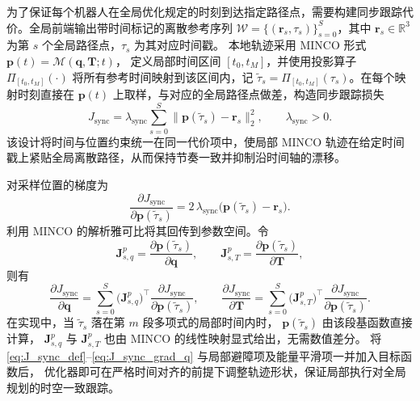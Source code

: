 为了保证每个机器人在全局优化规定的时刻到达指定路径点，需要构建同步跟踪代价。全局前端输出带时间标记的离散参考序列
\(\mathcal{W}=\{(\mathbf{r}_s,\tau_s)\}_{s=0}^{S}\)，其中
\(\mathbf{r}_s\in\mathbb{R}^3\) 为第 \(s\) 个全局路径点，\(\tau_s\) 为其对应时间戳。
本地轨迹采用 MINCO 形式 \(\mathbf{p}(t)=\mathcal{M}(\mathbf{q},\mathbf{T};t)\)，
定义局部时间区间 \([t_0,t_M]\)，并使用投影算子
\(\Pi_{[t_0,t_M]}(\cdot)\) 将所有参考时间映射到该区间内，记
\(\tilde{\tau}_s=\Pi_{[t_0,t_M]}(\tau_s)\)。在每个映射时刻直接在
\(\mathbf{p}(t)\) 上取样，与对应的全局路径点做差，构造同步跟踪损失
\begin{equation}
\label{eq:J_sync_def}
J_{\mathrm{sync}}
=\lambda_{\mathrm{sync}}\sum_{s=0}^{S}\big\|\mathbf{p}(\tilde{\tau}_s)-\mathbf{r}_s\big\|_2^{2},
\qquad \lambda_{\mathrm{sync}}>0.
\end{equation}
该设计将时间与位置约束统一在同一代价项中，使局部 MINCO 轨迹在给定时间戳上紧贴全局离散路径，从而保持节奏一致并抑制沿时间轴的漂移。

对采样位置的梯度为
\begin{equation}
\label{eq:J_sync_grad_p}
\frac{\partial J_{\mathrm{sync}}}{\partial \mathbf{p}(\tilde{\tau}_s)}
=2\,\lambda_{\mathrm{sync}}\big(\mathbf{p}(\tilde{\tau}_s)-\mathbf{r}_s\big).
\end{equation}
利用 MINCO 的解析雅可比将其回传到参数空间。令
\begin{equation}
\label{eq:minco_jac_sync}
\mathbf{J}^{p}_{s,q}=\frac{\partial \mathbf{p}(\tilde{\tau}_s)}{\partial \mathbf{q}},\qquad
\mathbf{J}^{p}_{s,T}=\frac{\partial \mathbf{p}(\tilde{\tau}_s)}{\partial \mathbf{T}},
\end{equation}
则有
\begin{equation}
\label{eq:J_sync_grad_q}
\frac{\partial J_{\mathrm{sync}}}{\partial \mathbf{q}}
=\sum_{s=0}^{S}\big(\mathbf{J}^{p}_{s,q}\big)^{\!\top}
\frac{\partial J_{\mathrm{sync}}}{\partial \mathbf{p}(\tilde{\tau}_s)},
\qquad
\frac{\partial J_{\mathrm{sync}}}{\partial \mathbf{T}}
=\sum_{s=0}^{S}\big(\mathbf{J}^{p}_{s,T}\big)^{\!\top}
\frac{\partial J_{\mathrm{sync}}}{\partial \mathbf{p}(\tilde{\tau}_s)}.
\end{equation}
在实现中，当 \(\tilde{\tau}_s\) 落在第 \(m\) 段多项式的局部时间内时，
\(\mathbf{p}(\tilde{\tau}_s)\) 由该段基函数直接计算，
\(\mathbf{J}^{p}_{s,q}\) 与 \(\mathbf{J}^{p}_{s,T}\) 也由 MINCO 的线性映射显式给出，无需数值差分。
将 \eqref{eq:J_sync_def}–\eqref{eq:J_sync_grad_q} 与局部避障项及能量平滑项一并加入目标函数后，
优化器即可在严格时间对齐的前提下调整轨迹形状，保证局部执行对全局规划的时空一致跟踪。

